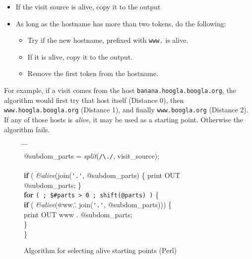 \documentclass[a4paper,twoside]{danarticle}
\theoremstyle{remark}
\begin{document}
       \begin{itemize}
         \item{If the visit source is alive, copy it to the output}
	 \item{As long as the hostname has more than two tokens, do the
	 following:}
	 \begin{itemize}
	   \item{Try if the new hostname, prefixed with \verb$www.$ is alive.}
	   \item{If it is alive, copy it to the output.}
	   \item{Remove the first token from the hostname.}
	 \end{itemize}
       \end{itemize}
       
       For example, if a visit comes from the host
       \verb$banana.hoogla.boogla.org$, the algorithm would first try that
       host itself (Distance 0), then \verb$www.hoogla.boogla.org$ (Distance 1),
       and finally
       \verb$www.boogla.org$ (Distance 2). If any of those hosts is
       \textit{alive}, it may be used as a starting point. Otherwise
       the algorithm fails.
       \begin{figure}[ht]
       {\ttfamily
       \begin{tabbing}
           \hspace{5mm} \= \hspace{5mm} \= \hspace{5mm} \= \hspace{5mm} \= \\
	   @subdom\_parts = \textit{split}(\verb$/\./$, visit\_source); \\
	   \\
	   \textbf{if} ( \textit{\&alive}(join(\verb$'.'$, @subdom\_parts) \{
	   print OUT @subdom\_parts; \} \\
	   \textbf{for} \verb-( ; $#parts > 0 ; shift(@parts) )- \{ \\
	   \>  \textbf{if} ( \textit{\&alive}(\"www.\" . join(\verb$'.'$,
    	   @subdom\_parts))) \{ \\
	   \> \> print OUT www . @subdom\_parts; \\
	   \> \} \\
	   \} \\
         \end{tabbing}}
	 \caption{Algorithm for selecting alive starting points (Perl)}
	 \label{domaintest}
       \end{figure}
\end{document}
